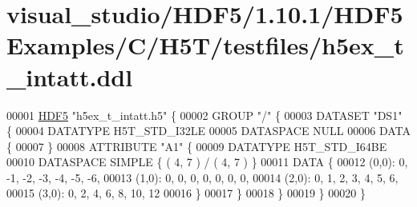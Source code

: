 \hypertarget{visual__studio_2_h_d_f5_21_810_81_2_h_d_f5_examples_2_c_2_h5_t_2testfiles_2h5ex__t__intatt_8ddl_source}{}\section{visual\+\_\+studio/\+H\+D\+F5/1.10.1/\+H\+D\+F5\+Examples/\+C/\+H5\+T/testfiles/h5ex\+\_\+t\+\_\+intatt.ddl}
\label{visual__studio_2_h_d_f5_21_810_81_2_h_d_f5_examples_2_c_2_h5_t_2testfiles_2h5ex__t__intatt_8ddl_source}

\begin{DoxyCode}
00001 \hyperlink{namespace_h_d_f5}{HDF5} \textcolor{stringliteral}{"h5ex\_t\_intatt.h5"} \{
00002 GROUP \textcolor{stringliteral}{"/"} \{
00003    DATASET \textcolor{stringliteral}{"DS1"} \{
00004       DATATYPE  H5T\_STD\_I32LE
00005       DATASPACE  NULL
00006       DATA \{
00007       \}
00008       ATTRIBUTE \textcolor{stringliteral}{"A1"} \{
00009          DATATYPE  H5T\_STD\_I64BE
00010          DATASPACE  SIMPLE \{ ( 4, 7 ) / ( 4, 7 ) \}
00011          DATA \{
00012          (0,0): 0, -1, -2, -3, -4, -5, -6,
00013          (1,0): 0, 0, 0, 0, 0, 0, 0,
00014          (2,0): 0, 1, 2, 3, 4, 5, 6,
00015          (3,0): 0, 2, 4, 6, 8, 10, 12
00016          \}
00017       \}
00018    \}
00019 \}
00020 \}
\end{DoxyCode}
